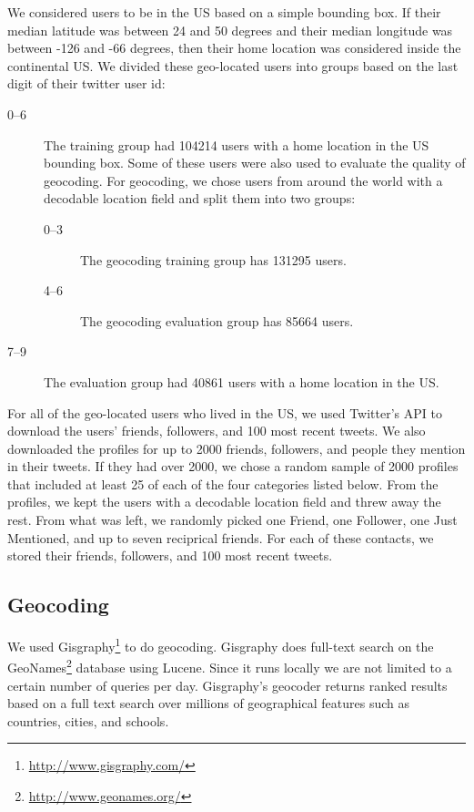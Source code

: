 \documentclass{sig-alternate}
\begin{document}
We considered users to be in the US based on a simple bounding box.  If their median latitude was between 24 and 50 degrees and their median longitude was between -126 and -66 degrees, then their home location was considered inside the continental US.
We divided these geo-located users into groups based on the last digit of their twitter user id:
\begin{description}
\item[0--6] The training group had 104214 users with a home location in the US bounding box. Some of these users were also used to evaluate the quality of geocoding. For geocoding, we chose users from around the world with a decodable location field and split them into two groups:
\begin{description}
\item[0--3] The geocoding training group has 131295 users.
\item[4--6] The geocoding evaluation group has 85664 users.
\end{description}
\item[7--9] The evaluation group had 40861 users with a home location in the US.
\end{description}

For all of the geo-located users who lived in the US, we used Twitter's API to download the users' friends, followers, and 100 most recent tweets.
We also downloaded the profiles for up to 2000 friends, followers, and people they mention in their tweets. If they had over 2000, we chose a random sample of 2000 profiles that included at least 25 of each of the four categories listed below.
From the profiles, we kept the users with a decodable location field and threw away the rest. From what was left, we randomly picked one Friend, one Follower, one Just Mentioned, and up to seven reciprical friends.
For each of these contacts, we stored their friends, followers, and 100 most recent tweets.

\subsection{Geocoding}
We used Gisgraphy\footnote{\url{http://www.gisgraphy.com/}} to do geocoding.
Gisgraphy does full-text search on the GeoNames\footnote{\url{http://www.geonames.org/}}
database using Lucene. Since
it runs locally we are not limited to a certain number of queries per day.
Gisgraphy's geocoder returns ranked results based on a full text search
over millions of geographical features such as countries, cities, and schools. 
\end{document}

